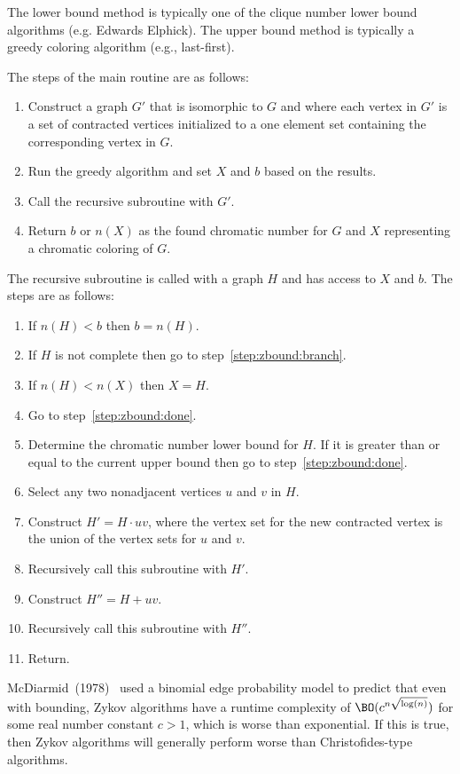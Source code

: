 The lower bound method is typically one of the clique number lower bound algorithms (e.g. Edwards Elphick).  The
upper bound method is typically a greedy coloring algorithm (e.g., last-first).

The steps of the main routine are as follows:
\begin{enumerate}
\item Construct a graph \(G'\) that is isomorphic to \(G\) and where each vertex in \(G'\) is a set of contracted
  vertices initialized to a one element set containing the corresponding vertex in \(G\).
\item Run the greedy algorithm and set \(X\) and \(b\) based on the results.
\item Call the recursive subroutine with \(G'\).
\item Return \(b\) or \(n(X)\) as the found chromatic number for \(G\) and \(X\) representing a chromatic coloring
  of \(G\).
\end{enumerate}

The recursive subroutine is called with a graph \(H\) and has access to \(X\) and \(b\).  The steps are as follows:
\begin{enumerate}
\item If \(n(H)<b\) then \(b=n(H)\).
\item If \(H\) is not complete then go to step~\ref{step:zbound:branch}.
\item If \(n(H)<n(X)\) then \(X=H\).
\item Go to step~\ref{step:zbound:done}.
\item\label{step:zbound:lower} Determine the chromatic number lower bound for \(H\).  If it is greater than or
  equal to the current upper bound then go to step~\ref{step:zbound:done}.
\item\label{step:zbound:branch} Select any two nonadjacent vertices \(u\) and \(v\) in \(H\).
\item Construct \(H'=H\cdot uv\), where the vertex set for the new contracted vertex is the union of the vertex
  sets for \(u\) and \(v\).
\item Recursively call this subroutine with \(H'\).
\item Construct \(H''=H+uv\).
\item Recursively call this subroutine with \(H''\).
\item\label{step:zbound:done} Return.
\end{enumerate}

McDiarmid~(1978)~\cite{mcdiarmid} used a binomial edge probability model to predict that even with bounding, Zykov
algorithms have a runtime complexity of \(\BO(c^{n\sqrt{\log(n)}})\) for some real number constant \(c>1\), which
is worse than exponential.  If this is true, then Zykov algorithms will generally perform worse than
Christofides-type algorithms.

